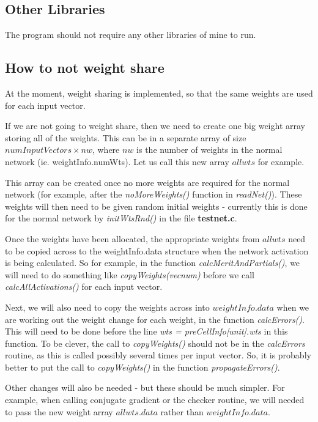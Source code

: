 \documentclass[a4paper]{article}
\begin{document}
\subsection{Other Libraries }

The program should not require any other libraries of mine to run.


\subsection{How to not weight share}

At the moment, weight sharing is implemented, so that the same weights
are used for each input vector.  

If we are not going to weight share, then we need to create one big
weight array storing all of the weights.  This can be in a separate
array of size $numInputVectors \times nw$, where $nw$ is the number of
weights in the normal network (ie. weightInfo.numWts).  Let us call
this new array $allwts$ for example.

This array can be created once no more weights are required for the
normal network (for example, after the {\em noMoreWeights()} function
in {\em readNet()}).  These weights will then need to be given random
initial weights - currently this is done for the normal network by
\emph{initWtsRnd()} in the file \textbf{testnet.c}.

Once the weights have been allocated, the appropriate weights from
$allwts$ need to be copied across to the weightInfo.data structure
when the network activation is being calculated.  So for example, in
the function \emph{calcMeritAndPartials()}, we will need to do
something like \emph{copyWeights(vecnum)} before we call
\emph{calcAllActivations()} for each input vector.  

Next, we will also need to copy the weights across into
$weightInfo.data$ when we are working out the weight change for
each weight, in the function \emph{calcErrors()}.  This will need to
be done before the line \emph{wts = preCellInfo[unit].wts} in this
function.  To be clever, the
call to \emph{copyWeights()} should not be in the \emph{calcErrors}
routine, as this is called possibly several times per input vector.
So, it is probably better to put the call to \emph{copyWeights()} in
the function \emph{propagateErrors()}. 

Other changes will also be needed - but these should be much
simpler. For example, when calling conjugate gradient or the checker
routine, we will needed to pass the new weight array $allwts.data$
rather than $weightInfo.data$.  
\end{document}

